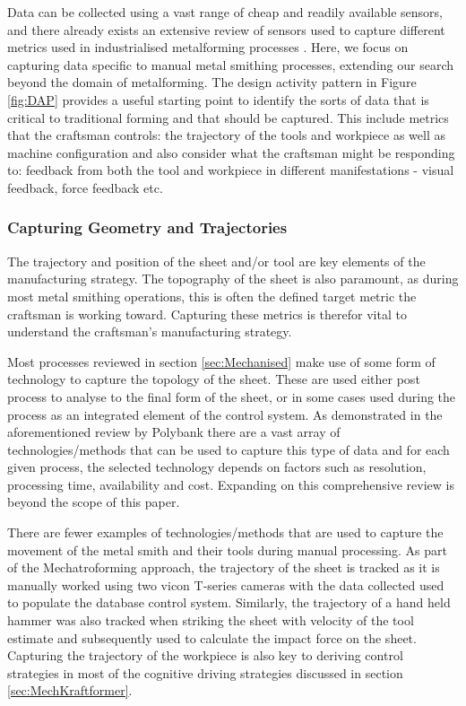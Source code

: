 Data can be collected using a vast range of cheap and readily available sensors, and there already exists an extensive review of sensors used to capture different metrics used in industrialised metalforming processes \citep{Allwood2016Closed-loopForming}. Here, we focus on capturing data specific to manual metal smithing processes, extending our search beyond the domain of metalforming. The design activity pattern in Figure \ref{fig:DAP} provides a useful starting point to identify the sorts of data that is critical to traditional forming and that should be captured. This include metrics that the craftsman controls: the trajectory of the tools and workpiece as well as machine configuration and also consider what the craftsman might be responding to: feedback from both the tool and workpiece in different manifestations - visual feedback, force feedback etc. 

\subsubsection{Capturing Geometry and Trajectories}
The trajectory and position of the sheet and/or tool are key elements of the manufacturing strategy. The topography of the sheet is also paramount, as during most metal smithing operations, this is often the defined target metric the craftsman is working toward. Capturing these metrics is therefor vital to understand the craftsman's manufacturing strategy.

Most processes reviewed in section \ref{sec:Mechanised} make use of some form of technology to capture the topology of the sheet. These are used either post process to analyse to the final form of the sheet, or in some cases used during the process as an integrated element of the control system. As demonstrated in the aforementioned review by Polybank \citep{Allwood2016Closed-loopForming} there are a vast array of technologies/methods that can be used to capture this type of data and for each given process, the selected technology depends on factors such as resolution, processing time, availability and cost. Expanding on this comprehensive review is beyond the scope of this paper.

There are fewer examples of technologies/methods that are used to capture the movement of the metal smith and their tools during manual processing. As part of the Mechatroforming approach, the trajectory of the sheet is tracked as it is manually worked  \citep{Ilangovan2016AnForming} using two vicon T-series cameras with the data collected used to populate the database control system. Similarly, the trajectory of a hand held hammer was also tracked when striking the sheet with velocity of the tool estimate and subsequently used to calculate the impact force on the sheet. Capturing the trajectory of the workpiece is also key to deriving control strategies in most of the cognitive driving strategies discussed in section \ref{sec:MechKraftformer}. 

